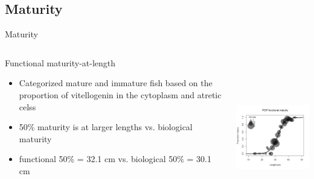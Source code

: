 \documentclass[pdf]{beamer}\usepackage[]{graphicx}\usepackage[]{color}
\begin{document}
\subsection{Maturity}
\begin{frame}{Maturity}
\begin{columns}
  \begin{column}{0.5\textwidth}
      Functional maturity-at-length
      \begin{itemize}
        \item Categorized mature and immature fish based on the proportion of vitellogenin in the cytoplasm and atretic celss
        \item 50\% maturity is at larger lengths vs. biological maturity
        \item functional 50\% = 32.1 cm vs. biological 50\% = 30.1 cm
      \end{itemize}
  \end{column}
  
  \begin{column}{0.5\textwidth}
  \begin{center}
    \includegraphics[height = 2.75in, width = 2.5in]{figures/Functional_Maturity.png}
  \end{center}
  \end{column}
\end{columns}
\end{frame}
\end{document}

